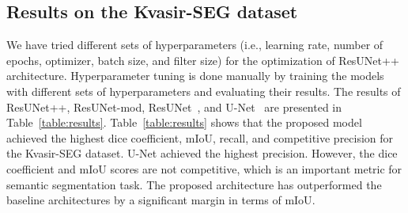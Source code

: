 \documentclass[conference]{IEEEtran}
\newcommand{\resunetplusplus}{ResUNet++\xspace}
\begin{document}
\subsection{Results on the Kvasir-SEG dataset}
We have tried different sets of hyperparameters (i.e., learning rate, number of epochs, optimizer, batch size, and filter size) for the optimization of \resunetplusplus architecture. Hyperparameter tuning is done manually by training the models with different sets of hyperparameters and evaluating their results. The results of \resunetplusplus, ResUNet-mod, ResUNet~\cite{zhang2018road}, and U-Net~\cite{ronneberger2015u} are  presented in Table~\ref{table:results}.  Table~\ref{table:results} shows that the proposed model achieved the highest dice coefficient, \ac{mIoU}, recall, and competitive precision for the Kvasir-SEG dataset. U-Net achieved the highest precision. However, the dice coefficient and \ac{mIoU} scores are not competitive, which is an important metric for semantic segmentation task. The proposed architecture has outperformed the baseline architectures by a significant margin in terms of \ac{mIoU}. 

\begin{table}[t]
 \caption{The table shows the evaluation results of all the models on Kvasir-SEG dataset.}
    \label{table:results}
    \vspace{-5mm}
   \def\arraystretch{1.1}
    \setlength\tabcolsep{5pt}
    \par\bigskip
    \centering
\end{table}									



 
\end{document}
